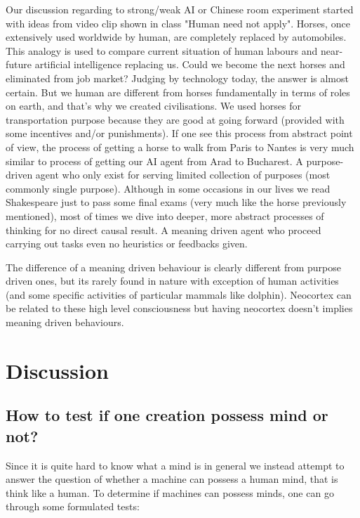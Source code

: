 \documentclass[11pt]{article}
\begin{document}
Our discussion regarding to strong/weak AI or Chinese room experiment started with ideas from video clip shown in class "Human need not apply". Horses, once extensively used worldwide by human, are completely replaced by automobiles. This analogy is used to compare current situation of human labours and near-future artificial intelligence replacing us. Could we become the next horses and eliminated from job market? Judging by technology today, the answer is almost certain. But we human are different from horses fundamentally in terms of roles on earth, and that's why we created civilisations. We used horses for transportation purpose because they are good at going forward (provided with some incentives and/or punishments). If one see this process from abstract point of view, the process of getting a horse to walk from Paris to Nantes is very much similar to process of getting our AI agent from Arad to Bucharest. A purpose-driven agent who only exist for serving limited collection of purposes (most commonly single purpose). Although in some occasions in our lives we read Shakespeare just to pass some final exams (very much like the horse previously mentioned), most of times we dive into deeper, more abstract processes of thinking for no direct causal result. A meaning driven agent who proceed carrying out tasks even no heuristics or feedbacks given. 

The difference of a meaning driven behaviour is clearly different from purpose driven ones, but its rarely found in nature with exception of human activities (and some specific activities of particular mammals like dolphin). Neocortex can be related to these high level consciousness but having neocortex doesn't implies meaning driven behaviours. 

\section{Discussion}
\label{sec:discussion}

\subsection{How to test if one creation possess mind or not?}

Since it is quite hard to know what a mind is in general we instead attempt to answer the question of whether a machine can possess a human mind, that is think like a human. To determine if machines can possess minds, one can go through some formulated tests:
\end{document}
